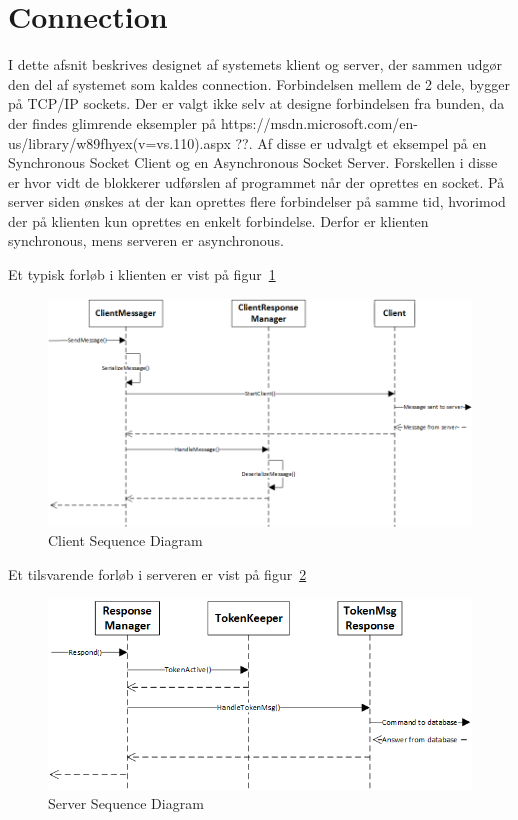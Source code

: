 \section{Connection}
I dette afsnit beskrives designet af systemets klient og server, der sammen udgør den del af systemet som kaldes connection. Forbindelsen mellem de 2 dele, bygger på TCP/IP sockets. Der er valgt ikke selv at designe forbindelsen fra bunden, da der findes glimrende eksempler på https://msdn.microsoft.com/en-us/library/w89fhyex(v=vs.110).aspx ??. Af disse er udvalgt et eksempel på en Synchronous Socket Client og en Asynchronous Socket Server. Forskellen i disse er hvor vidt de blokkerer udførslen af programmet når der oprettes en socket. På server siden ønskes at der kan oprettes flere forbindelser på samme tid, hvorimod der på klienten kun oprettes en enkelt forbindelse. Derfor er klienten synchronous, mens serveren er asynchronous.

Et typisk forløb i klienten er vist på figur~\ref{fig:ClientSequence}
\begin{figure}
	\centering
	\includegraphics[width=0.9\linewidth]{figs/connection/ClientSequence.png}
	\caption{Client Sequence Diagram}
	\label{fig:ClientSequence}
\end{figure}

Et tilsvarende forløb i serveren er vist på figur~\ref{fig:ServerSequenceResponse}
\begin{figure}
	\centering
	\includegraphics[width=0.9\linewidth]{figs/connection/ServerSequenceResponse.png}
	\caption{Server Sequence Diagram}
	\label{fig:ServerSequenceResponse}
\end{figure}